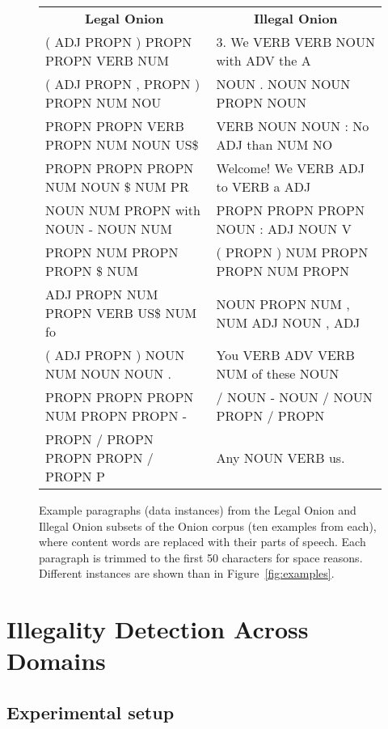 \documentclass[11pt,a4paper,table]{article}
\begin{document}
{\begin{figure*}[t]
\centering
\small
\begin{tabular}{l|l}
\multicolumn{1}{c}{\textbf{Legal Onion}} &
\multicolumn{1}{c}{\textbf{Illegal Onion}}\\
( ADJ PROPN ) PROPN PROPN VERB NUM &3. We VERB VERB NOUN with ADV the A\\
( ADJ PROPN , PROPN ) PROPN NUM NOU&NOUN . NOUN NOUN PROPN NOUN\\
PROPN PROPN VERB PROPN NUM NOUN US\$&VERB NOUN NOUN : No ADJ than NUM NO\\
PROPN PROPN PROPN NUM NOUN \$ NUM PR&Welcome! We VERB ADJ to VERB a ADJ \\
NOUN NUM PROPN with NOUN - NOUN NUM&PROPN PROPN PROPN NOUN : ADJ NOUN V\\
PROPN NUM PROPN PROPN \$ NUM&( PROPN ) NUM PROPN PROPN NUM PROPN\\
ADJ PROPN NUM PROPN VERB US\$ NUM fo&NOUN PROPN NUM , NUM ADJ NOUN , ADJ\\
( ADJ PROPN ) NOUN NUM NOUN NOUN . &You VERB ADV VERB NUM of these NOUN\\
PROPN PROPN PROPN NUM PROPN PROPN -&/ NOUN - NOUN / NOUN PROPN / PROPN \\
PROPN / PROPN PROPN PROPN / PROPN P&Any NOUN VERB us.\\
\end{tabular}
\caption{Example paragraphs (data instances) from the Legal Onion and
Illegal Onion subsets of the Onion corpus (ten examples from each),
where content words are replaced with their parts of speech.
Each paragraph is trimmed to the first 50 characters for space reasons.
Different instances are shown than in Figure~\ref{fig:examples}.
\label{fig:examples_poscontent}}
\end{figure*}

\section{Illegality Detection Across Domains} \label{sec:cross_domains}

\subsection{Experimental setup}

}
\end{document}
